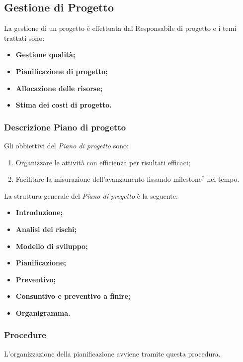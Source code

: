 \documentclass[11pt,a4paper]{article}
\begin{document}
{	\subsection{Gestione di Progetto}
	La gestione di un progetto è effettuata dal Responsabile di progetto e i temi trattati sono:
	\begin{itemize}
		\item \textbf{Gestione qualità;}
		\item \textbf{Pianificazione di progetto;}
		\item \textbf{Allocazione delle risorse;}
		\item \textbf{Stima dei costi di progetto.}
	\end{itemize}
	
	\subsubsection{Descrizione Piano di progetto}
	
	Gli obbiettivi del \textit{Piano di progetto} sono:
	
	\begin{enumerate}
		\item Organizzare le attività con efficienza per risultati efficaci;
		\item Facilitare la misurazione dell'avanzamento fissando milestone$^*$ nel tempo.
	\end{enumerate}
	
	La struttura generale del \textit{Piano di progetto} è la seguente:
	\begin{itemize}
		\item \textbf{Introduzione;}
		\item \textbf{Analisi dei rischi;}
		\item \textbf{Modello di sviluppo;}
		\item \textbf{Pianificazione;}
		\item \textbf{Preventivo;}
		\item \textbf{Consuntivo e preventivo a finire;}
		\item \textbf{Organigramma.}
	\end{itemize}
	
	\subsubsection{Procedure}
	
	L’organizzazione della pianificazione avviene tramite questa procedura.
	
}
\end{document}
